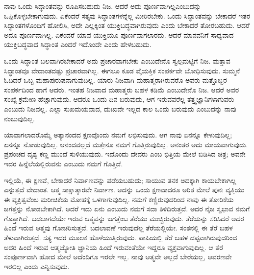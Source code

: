 ನಾವು ಒಂದು ಸಿದ್ಧಾಂತವನ್ನು ರೂಪಿಸಬಹುದು ನಿಜ. ಆದರೆ ಅದು ಪೂರ್ಣವಾಗಿಲ್ಲ\break ಎಂಬುದನ್ನು ಒಪ್ಪಿಕೊಳ್ಳಬೇಕಾಗುವುದು. ಏಕೆಂದರೆ ಸತ್ಯವು ಸಿದ್ಧಾಂತಗಳನ್ನೆಲ್ಲ ಮೀರಿರಬೇಕು. ಒಂದು ಸಿದ್ಧಾಂತವನ್ನು ಬೇಕಾದರೆ ಇತರ ಸಿದ್ಧಾಂತಗಳೊಂದಿಗೆ ಹೋಲಿಸಿ, ಅದೇ ಎಲ್ಲಕ್ಕಿಂತ ಯುಕ್ತಿಬದ್ಧವಾಗಿರುವುದು ಎಂದು ಬೇಕಾದರೆ ತೋರಬಹುದು. ಆದರೆ ಅದೂ ಪೂರ್ಣವಾಗಿಲ್ಲ. ಏಕೆಂದರೆ ಯಾವ ಯುಕ್ತಿಯೂ ಪೂರ್ಣವಾಗಲಾರದು. ಆದರೆ ಮಾನವನಿಗೆ ಸಾಧ್ಯವಾದ ಯುಕ್ತಿಬದ್ಧವಾದ ಸಿದ್ಧಾಂತ ಎಂದರೆ ಇದೊಂದೇ ಎಂದು ಹೇಳಬಹುದು.

ಒಂದು ಸಿದ್ಧಾಂತ ಬಲವಾಗಿರಬೇಕಾದರೆ ಅದು ಪ್ರಚಾರವಾಗಬೇಕು ಎಂಬುದೇನೊ ಸ್ವಲ್ಪಮಟ್ಟಿಗೆ ನಿಜ. ಮತ್ತಾವ ಸಿದ್ಧಾಂತವೂ ವೇದಾಂತದಷ್ಟು ಪ್ರಚಾರವಾಗಿಲ್ಲ. ಈಗಲೂ ಕೂಡ ವೈಯಕ್ತಿಕ ಸಂಪರ್ಕವೇ ಬೋಧಿಸುವುದು. ಸುಮ್ಮನೆ ಓದಿದರೆ ಒಬ್ಬ ಮಹಾಪುರುಷನಾಗುವುದಿಲ್ಲ. ಯಾರು ನಿಜವಾಗಿ ಮಹಾತ್ಮರಾಗಿರುವರೊ ಅವರು ಮತ್ತೊಬ್ಬರ ಸಂಪರ್ಕದಿಂದ ಹಾಗೆ ಆದರು. ಇಂತಹ ನಿಜವಾದ ಮಹಾತ್ಮರು ಬಹಳ ಕಡಿಮೆ ಎಂಬುದೇನೊ ನಿಜ. ಆದರೆ ಅವರ ಸಂಖ್ಯೆ ಕ್ರಮೇಣ ಹೆಚ್ಚಾಗುವುದು. ಆದರೂ ಒಂದು ದಿನ ಬರುವುದು, ಆಗ ಇರುವವರೆಲ್ಲ ತತ್ತ್ವಜ್ಞಾನಿಗಳಾಗುವರು ಎಂಬುದು ನಿಜವಲ್ಲ. ಎಲ್ಲಾ ಸುಖಮಯವಾದ, ದುಃಖವೇ ಇಲ್ಲದ ಕಾಲ ಒಂದು ಬರುವುದು ಎಂಬುದನ್ನು ನಾವು ನಂಬುವುದಿಲ್ಲ.

ಯಾವಾಗಲಾದರೊಮ್ಮೆ ಅತ್ಯಾನಂದದ ಕ್ಷಣವೊಂದು ನಮಗೆ ಲಭಿಸುವುದು. ಆಗ ನಾವು ಏನನ್ನೂ ಕೇಳುವುದಿಲ್ಲ; ಏನನ್ನೂ ನೋಡುವುದಿಲ್ಲ. ಆನಂದವಲ್ಲದೆ ಮತ್ತೇನೂ ನಮಗೆ ಗೊತ್ತಿರುವುದಿಲ್ಲ. ಅನಂತರ ಅದು ಮಾಯವಾಗುವುದು. ಪ್ರಪಂಚದ ದೃಶ್ಯ ಕಣ್ಣ ಮುಂದೆ ಸುಳಿಯುವುದು. ಇದೊಂದು ದೇವರು ಎಂಬ ಭಿತ್ತಿಯ ಮೇಲೆ ಬಿಡಿಸಿದ ಚಿತ್ರ; ಅವನೇ ಇದರ ಹಿನ್ನೆಲೆಯಲ್ಲಿರುವನು ಎಂಬುದು ನಮಗೆ ಗೊತ್ತಿದೆ.

ಇಲ್ಲಿಯೆ, ಈ ಕ್ಷಣವೆ, ಬೇಕಾದರೆ ನಿರ್ವಾಣವನ್ನು ಪಡೆಯಬಹುದು; ಸಾಯುವ ತನಕ ಅದಕ್ಕಾಗಿ ಕಾಯಬೇಕಾಗಿಲ್ಲ ಎನ್ನುತ್ತದೆ ವೇದಾಂತ. ಆತ್ಮ ಸಾಕ್ಷಾತ್ಕಾರವೇ ನಿರ್ವಾಣ. ಅದನ್ನು ಒಂದು ಕ್ಷಣವಾದರೂ ಅರಿತ ಮೇಲೆ ಪುನಃ ವ್ಯಕ್ತಿಯು ಈ ವ್ಯಕ್ತಿತ್ವವೆಂಬ ಮರೀಚಿಕೆಯ ಮೋಹಕ್ಕೆ ಒಳಗಾಗುವುದಿಲ್ಲ. ನಮಗೆ ಕಣ್ಣಿರುವುದರಿಂದ ನಾವು ಈ ತೋರಿಕೆಯ ಜಗತ್ತನ್ನು ನೋಡಬೇಕಾಗಿದೆ. ಆದರೆ ಇದು ಏನು ಎಂಬುದು ನಮಗೆ ಸದಾ ತಿಳಿದಿರುತ್ತದೆ. ಅದರ ನೈಜ ಸ್ವಭಾವ ನಮಗೆ ಗೊತ್ತಾಗಿದೆ. ಬದಲಾಗದೆಯೇ ಇರುವ ಆತ್ಮವನ್ನು ಜಗತ್ತೆಂಬ ತೆರೆಯು ಮುಚ್ಚಿರುವುದು. ತೆರೆಯನ್ನು ಸರಿಸಿದರೆ ಅದರ ಹಿಂದೆ ಇರುವ ಆತ್ಮವು ಗೋಚರಿಸುತ್ತದೆ. ಬದಲಾವಣೆ ಇರುವುದೆಲ್ಲ ತೆರೆಯಲ್ಲಿಯೇ. ಸಂತನಲ್ಲಿ ಈ ತೆರೆ ಬಹಳ ತೆಳುವಾಗಿರುತ್ತದೆ. ಸತ್ಯ ಇದರ ಮೂಲಕ ಹೊಳೆಯುತ್ತಿರುವುದು. ಪಾಪಿಯಲ್ಲಿ ತೆರೆ ಬಹಳ ದಪ್ಪವಾಗಿರುವುದರಿಂದ ಅದರ ಹಿಂದೆ ಇರುವ ಆತ್ಮಜ್ಯೋತಿ ಜ್ಞಾನಿಯ ಹಿಂದೆ ಇರುವಂತೆಯೇ ಇದ್ದರೂ ವ್ಯಕ್ತವಾಗುವುದಿಲ್ಲ. ಆ ತೆರೆ ಸಂಪೂರ್ಣವಾಗಿ ಹೋದ ಮೇಲೆ ಅದೆಂದಿಗೂ ಇರಲೇ ಇಲ್ಲ. ನಾವು ಆತ್ಮವೇ ಅಲ್ಲದೆ ಬೇರೆಯಲ್ಲ, ಆವರಣವೇ ಇರಲಿಲ್ಲ ಎಂದು ಎನ್ನಿಸುವುದು.


